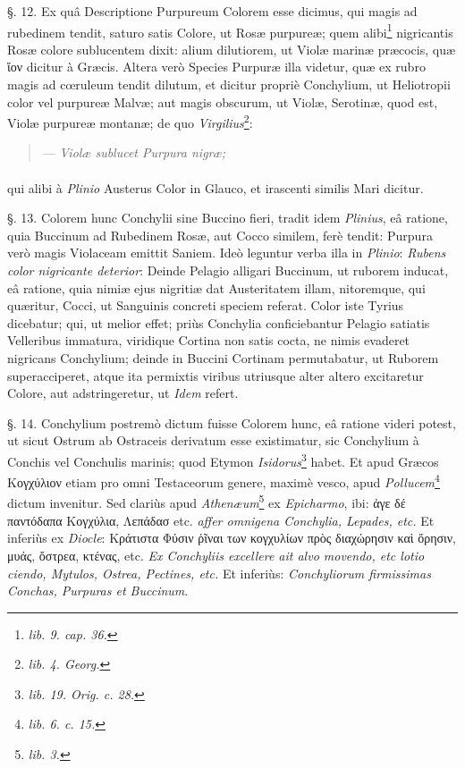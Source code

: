 \documentclass[a4paper, 11pt, oneside, polutonikogreek, german]{article}
\begin{document}
§. 12. Ex quâ Descriptione Purpureum Colorem esse dicimus, qui magis ad rubedinem tendit, saturo satis Colore, ut Rosæ purpureæ; quem alibi\footnote{\emph{lib. 9. cap. 36.}} nigricantis Rosæ colore sublucentem dixit: alium dilutiorem, ut Violæ marinæ præcocis, quæ ἴον dicitur à Græcis. Altera verò Species Purpuræ illa videtur, quæ ex rubro magis ad cœruleum tendit dilutum, et dicitur propriè Conchylium, ut Heliotropii color vel purpureæ Malvæ; aut magis obscurum, ut Violæ, Serotinæ, quod est, Violæ purpureæ montanæ; de quo \emph{Virgilius}\footnote{\emph{lib. 4. Georg.}}:
\begin{quotation}
--- \emph{Violæ sublucet Purpura nigræ;}
\end{quotation}
\paragraph{}
qui alibi à \emph{Plinio} Austerus Color in Glauco, et irascenti similis Mari dicitur.

§. 13. Colorem hunc Conchylii sine Buccino fieri, tradit idem \emph{Plinius}, eâ ratione, quia Buccinum ad Rubedinem Rosæ, aut Cocco similem, ferè tendit: Purpura verò magis Violaceam emittit Saniem. Ideò leguntur verba illa in \emph{Plinio}: \emph{Rubens color nigricante deterior}: Deinde Pelagio alligari Buccinum, ut ruborem inducat, eâ ratione, quia nimiæ ejus nigritiæ dat Austeritatem illam, nitoremque, qui quæritur, Cocci, ut Sanguinis concreti speciem referat. Color iste Tyrius dicebatur; qui, ut melior effet; priùs Conchylia conficiebantur Pelagio satiatis Velleribus immatura, viridique Cortina non satis cocta, ne nimis evaderet nigricans Conchylium; deinde in Buccini Cortinam permutabatur, ut Ruborem superacciperet, atque ita permixtis viribus utriusque alter altero excitaretur Colore, aut adstringeretur, ut \emph{Idem} refert.

§. 14. Conchylium postremò dictum fuisse Colorem hunc, eâ ratione videri potest, ut sicut Ostrum ab Ostraceis derivatum esse existimatur, sic Conchylium à Conchis vel Conchulis marinis; quod Etymon \emph{Isidorus}\footnote{\emph{lib. 19. Orig. c. 28.}} habet. Et apud Græcos Κογχύλιον etiam pro omni Testaceorum genere, maximè vesco, apud \emph{Pollucem}\footnote{\emph{lib. 6. c. 15.}} dictum invenitur. Sed clariùs apud \emph{Athenæum}\footnote{\emph{lib. 3.}} ex \emph{Epicharmo}, ibi: ἀγε δέ παντόδαπα Κογχύλια, Λεπάδασ etc. \emph{affer omnigena Conchylia, Lepades, etc.} Et inferiùs ex \emph{Diocle}: Κράτιστα Φύσιν ῥῖναι των κογχυλίων πρὸς διαχώρησιν καὶ ὄρησιν, μυάς, ὄστρεα, κτένας, etc. \emph{Ex Conchyliis excellere ait alvo movendo, etc lotio ciendo, Mytulos, Ostrea, Pectines, etc.} Et inferiùs: \emph{Conchyliorum firmissimas Conchas, Purpuras et Buccinum}.
\end{document}
